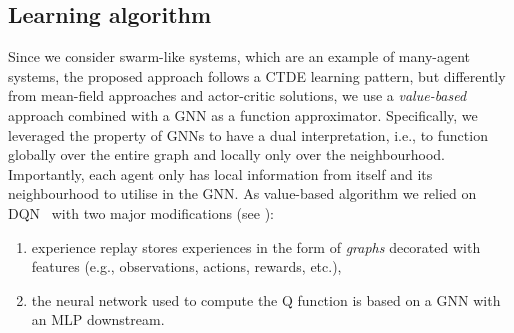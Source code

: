 \documentclass[conference]{IEEEtran}
\begin{document}
\subsection{Learning algorithm}
Since we consider swarm-like systems, which are an example of many-agent systems, 
 the proposed approach follows a \ac{CTDE} learning pattern,
 but differently from mean-field approaches and actor-critic solutions,
 we use a \emph{value-based} approach combined with a \ac{GNN} as a function approximator.
%
%
Specifically, we leveraged the property of \ac{GNN}s to have a dual interpretation, 
i.e., to function globally over the entire graph and locally only over the neighbourhood. 
Importantly, each agent only has local information from itself and its neighbourhood to utilise in the \ac{GNN}.
%
As value-based algorithm we relied on \ac{DQN}~\cite{mnih2015playing}  with two major modifications (see ): 
\begin{enumerate}
  \item experience replay stores experiences in the form of \emph{graphs} decorated with features (e.g., observations, actions, rewards, etc.),
  \item the neural network used to compute the Q function is based on a \ac{GNN} with an \ac{MLP} downstream.
\end{enumerate}
\end{document}
